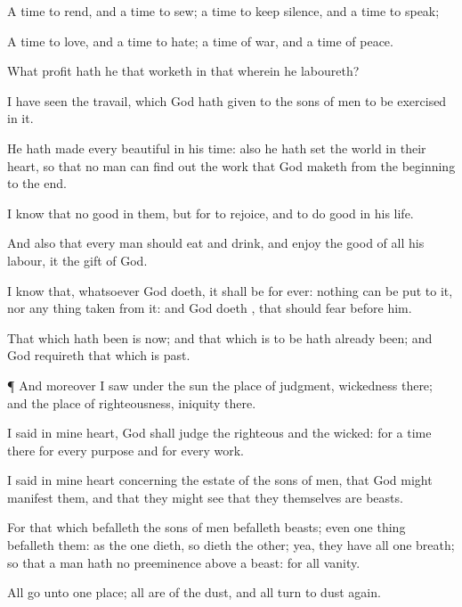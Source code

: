 {A
time to
rend, and a
time to
sew; a
time to keep
silence, and a
time to
speak;

A
time to
love, and a
time to
hate; a
time of
war, and a
time of
peace.

What
profit hath he that
worketh in that
wherein he
laboureth?

I have
seen the
travail, which
God hath
given to the
sons of
men to be
exercised in it.


\par }{\PP {}He hath
made every
{}
beautiful in his
time: also he hath
set the
world in their
heart, so
that no
man can find
out the
work that
God
maketh from the
beginning to the
end.

I
know that
{} no
good in them, but for
{} to
rejoice, and to
do
good in his
life.

And also that every
man should
eat and
drink, and
enjoy the
good of all his
labour, it
{} the
gift of
God.

I
know that, whatsoever
God
doeth, it shall be for
ever:
nothing can be
put to it, nor any thing
taken from it: and
God
doeth
{}, that
{} should
fear
before him.

That which hath been is
now; and that which is to be hath
already been; and
God
requireth that which is
past.


\par }{\PP {}¶ And moreover I
saw under the
sun the
place of
judgment,
{}
wickedness
{} there; and the
place of
righteousness,
{}
iniquity
{} there.

I
said in mine
heart,
God shall
judge the
righteous and the
wicked: for
{} a
time there for every
purpose and for every
work.

I
said in mine
heart concerning the
estate of the
sons of
men, that
God might
manifest them, and that they might
see that
they themselves are
beasts.

For that which
befalleth the
sons of
men
befalleth
beasts; even one
thing
befalleth them: as the one
dieth, so
dieth the
other; yea, they have all
one
breath; so that a
man hath no
preeminence above a
beast: for all
{}
vanity.

All
go unto
one
place; all are of the
dust, and all
turn to
dust
again.

}
